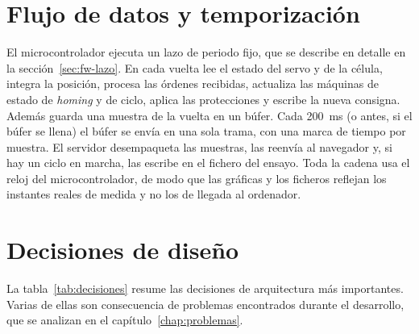 \section{Flujo de datos y temporización}

El microcontrolador ejecuta un lazo de periodo fijo, que se describe en detalle en la
sección~\ref{sec:fw-lazo}. En cada vuelta lee el estado del servo y de la célula, integra la
posición, procesa las órdenes recibidas, actualiza las máquinas de estado de \emph{homing} y de
ciclo, aplica las protecciones y escribe la nueva consigna. Además guarda una muestra de la vuelta
en un búfer. Cada \SI{200}{\milli\second} (o antes, si el búfer se llena) el búfer se envía en una
sola trama, con una marca de tiempo por muestra. El servidor desempaqueta las muestras, las
reenvía al navegador y, si hay un ciclo en marcha, las escribe en el fichero del ensayo. Toda la
cadena usa el reloj del microcontrolador, de modo que las gráficas y los ficheros reflejan los
instantes reales de medida y no los de llegada al ordenador.

\section{Decisiones de diseño}

La tabla~\ref{tab:decisiones} resume las decisiones de arquitectura más importantes. Varias de
ellas son consecuencia de problemas encontrados durante el desarrollo, que se analizan en el
capítulo~\ref{chap:problemas}.

